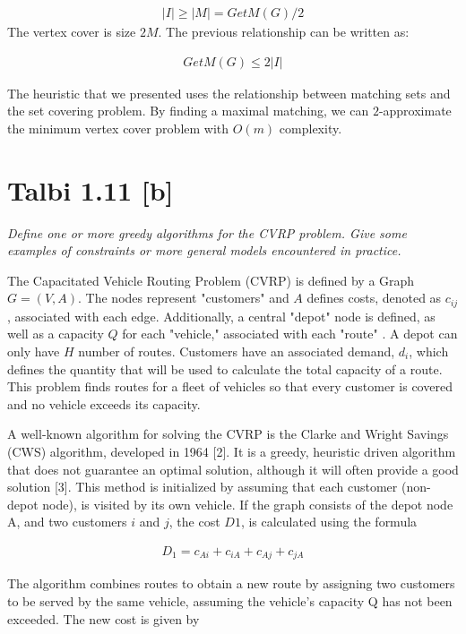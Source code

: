 \documentclass[12pt]{article}
\begin{document}
\begin{align*}
|I|  \geq |M| = GetM(G) / 2
\end{align*}
The vertex cover is size $2M$. The previous relationship can be written as:

\begin{align*}
GetM(G) \leq 2 |I|
\end{align*}

The heuristic that we presented uses the relationship between matching sets and the set covering problem. By finding a maximal matching, we can $2$-approximate the minimum vertex cover problem with $O(m)$ complexity.



\section{Talbi 1.11 [b]}

\textit{Define one or more greedy algorithms for the CVRP problem. Give some examples of constraints or more general models encountered in practice.}

The Capacitated Vehicle Routing Problem (CVRP) is defined by a Graph $G = (V, A)$. The nodes represent "customers" and $A$ defines costs, denoted as $c_{ij}$, associated with each edge. Additionally, a central "depot" node is defined, as well as a capacity $Q$ for each "vehicle," associated with each "route" \cite{MCT1}. A depot can only have $H$ number of routes. Customers have an associated demand, $d_i$, which defines the quantity that will be used to calculate the total capacity of a route. This problem finds routes for a fleet of vehicles so that every customer is covered and no vehicle exceeds its capacity.

A well-known algorithm for solving the CVRP is the Clarke and Wright Savings (CWS) algorithm, developed in 1964 [2]. It is a greedy, heuristic driven algorithm that does not guarantee an optimal solution, although it will often provide a good solution [3]. This method is initialized by assuming that each customer (non-depot node), is visited by its own vehicle. If the graph consists of the depot node A, and two customers $i$ and $j$, the cost $D1$, is calculated using the formula

\begin{align*}
D_1 = c_{Ai} + c_{iA} + c_{Aj} + c_{jA}
\end{align*}

The algorithm combines routes to obtain a new route by assigning two customers to be served by the same vehicle, assuming the vehicle's capacity Q has not been exceeded. The new cost is given by
\end{document}
